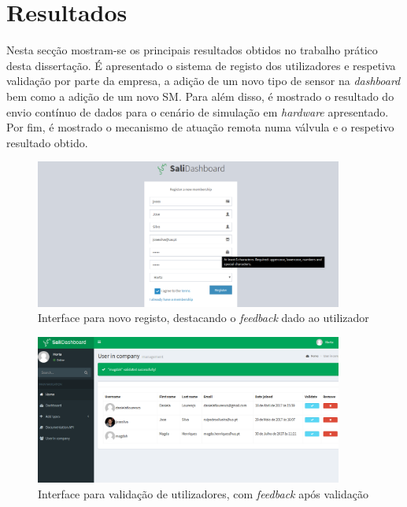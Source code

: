 \section{Resultados}

Nesta secção mostram-se os principais resultados obtidos no trabalho prático desta dissertação. É apresentado o sistema de registo dos utilizadores e respetiva validação por parte da empresa, a adição de um novo tipo de sensor na \textit{dashboard} bem como a adição de um novo \acl{SM}. Para além disso, é mostrado o resultado do envio contínuo de dados para o cenário de simulação em \textit{hardware} apresentado. Por fim, é mostrado o mecanismo de atuação remota numa válvula e o respetivo resultado obtido. 


\newpage


\begin{figure}[h]
	\centering

		\includegraphics[width=0.9\textwidth]{prints-web/register.png}
		\caption{Interface para novo registo, destacando o \textit{feedback} dado ao utilizador}
		\label{novouser}
	
\end{figure}



\begin{figure}[h]
	\centering
		\centering
		\includegraphics[width=0.9\textwidth]{prints-web/validate_company.png}
		\caption{Interface para validação de utilizadores, com \textit{feedback} após validação}
		\label{validateuser}

\end{figure}




